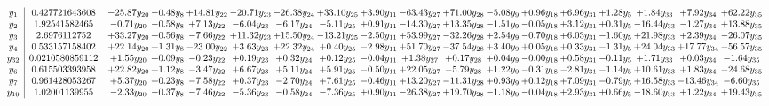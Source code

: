 \documentclass[9pt]{article}
\begin{document}
\[\begin{array}{c| c c@{\hskip 2pt} c@{\hskip 2pt} c@{\hskip 2pt} c@{\hskip 2pt} c@{\hskip 2pt} c@{\hskip 2pt} c@{\hskip 2pt} c@{\hskip 2pt} c@{\hskip 2pt} c@{\hskip 2pt} c@{\hskip 2pt} c@{\hskip 2pt} c@{\hskip 2pt} c@{\hskip 2pt} c@{\hskip 2pt} c@{\hskip 2pt} }
 y_{1}   &  0.427721643608 & -25.87 y_{20} & -0.48 y_{8} & + 14.81 y_{22} & -20.71 y_{23} & -26.38 y_{24} & + 33.10 y_{25} & +  3.90 y_{11} & -63.43 y_{27} & + 71.00 y_{28} & -5.08 y_{9} & +  0.96 y_{18} & +  6.96 y_{31} & +  1.28 y_{5} & +  1.84 y_{33} & +  7.92 y_{34} & + 62.22 y_{35}\\
 y_{2}   &  1.92541582465 & -0.71 y_{20} & -0.58 y_{8} & +  7.13 y_{22} & -6.04 y_{23} & -6.17 y_{24} & -5.11 y_{25} & +  0.91 y_{11} & -14.30 y_{27} & + 13.35 y_{28} & -1.51 y_{9} & -0.05 y_{18} & +  3.12 y_{31} & +  0.31 y_{5} & -16.44 y_{33} & -1.27 y_{34} & + 13.88 y_{35}\\
 y_{3}   &  2.6976112752 & + 33.27 y_{20} & +  0.56 y_{8} & -7.66 y_{22} & + 11.32 y_{23} & + 15.50 y_{24} & -13.21 y_{25} & -2.50 y_{11} & + 53.99 y_{27} & -32.26 y_{28} & +  2.54 y_{9} & -0.70 y_{18} & +  6.03 y_{31} & -1.60 y_{5} & + 21.98 y_{33} & +  2.39 y_{34} & -26.07 y_{35}\\
 y_{4}   &  0.533157158402 & + 22.14 y_{20} & +  1.31 y_{8} & -23.00 y_{22} & +  3.63 y_{23} & + 22.32 y_{24} & +  0.40 y_{25} & -2.98 y_{11} & + 51.70 y_{27} & -37.54 y_{28} & +  3.40 y_{9} & +  0.05 y_{18} & +  0.33 y_{31} & -1.31 y_{5} & + 24.04 y_{33} & + 17.77 y_{34} & -56.57 y_{35}\\
 y_{32}   &  0.0210580859112 & +  1.55 y_{20} & +  0.09 y_{8} & -0.23 y_{22} & +  0.19 y_{23} & +  0.32 y_{24} & +  0.12 y_{25} & -0.04 y_{11} & +  1.38 y_{27} & +  0.17 y_{28} & +  0.04 y_{9} & -0.00 y_{18} & +  0.58 y_{31} & -0.11 y_{5} & +  1.71 y_{33} & +  0.03 y_{34} & -1.64 y_{35}\\
 y_{6}   &  0.615503393958 & + 22.82 y_{20} & +  1.12 y_{8} & -3.47 y_{22} & +  6.67 y_{23} & +  5.11 y_{24} & +  5.91 y_{25} & -0.50 y_{11} & + 22.05 y_{27} & -5.79 y_{28} & +  1.22 y_{9} & -0.31 y_{18} & -2.81 y_{31} & -1.14 y_{5} & + 10.61 y_{33} & +  1.83 y_{34} & -24.68 y_{35}\\
 y_{7}   &  0.961428053267 & +  5.37 y_{20} & +  0.23 y_{8} & -7.58 y_{22} & +  0.37 y_{23} & -2.70 y_{24} & +  7.61 y_{25} & -0.46 y_{11} & + 13.20 y_{27} & -11.31 y_{28} & +  0.93 y_{9} & +  0.12 y_{18} & +  7.09 y_{31} & -0.79 y_{5} & + 16.58 y_{33} & -13.46 y_{34} & -6.60 y_{35}\\
 y_{19}   &  1.02001139955 & -2.33 y_{20} & -0.37 y_{8} & -7.46 y_{22} & -5.36 y_{23} & -0.58 y_{24} & -7.36 y_{25} & +  0.90 y_{11} & -26.38 y_{27} & + 19.70 y_{28} & -1.18 y_{9} & -0.04 y_{18} & +  2.93 y_{31} & +  0.66 y_{5} & -18.60 y_{33} & +  1.22 y_{34} & + 19.43 y_{35}\\

\end{array}\]
\end{document}
